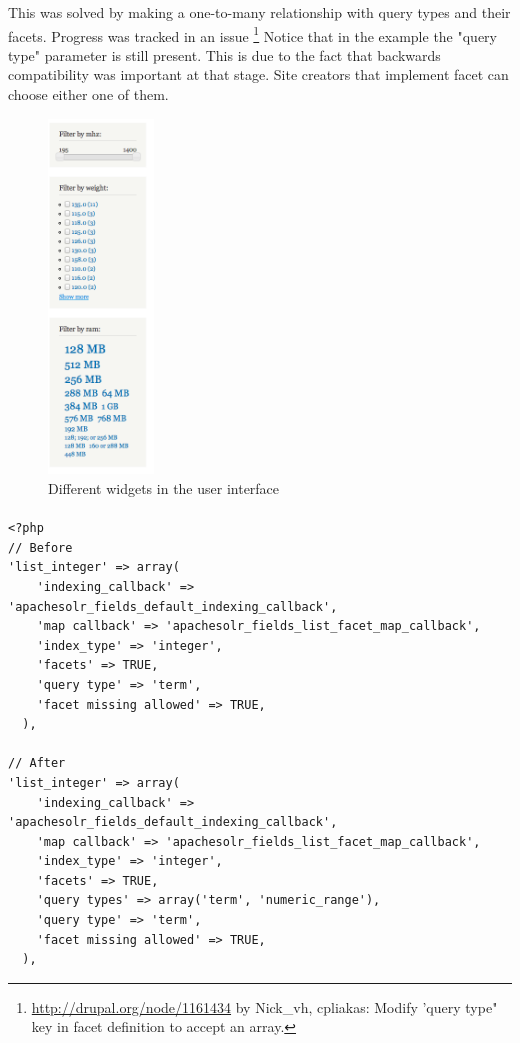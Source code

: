 This was solved by making a one-to-many relationship with query types and their facets. Progress was tracked in an issue \footnote{\url{http://drupal.org/node/1161434} by Nick\_vh, cpliakas: Modify 'query type" key in facet definition to accept an array.} Notice that in the example the "query type" parameter is still present. This is due to the fact that backwards compatibility was important at that stage. Site creators that implement facet can choose either one of them.

\begin{figure}
\begin{center}
     \vspace{-25pt}
     \includegraphics[width=0.25\textwidth]{images/implementation/facetapi_widgets.png}
     \caption{Different widgets in the user interface}
     \vspace{-25pt}
\end{center}
\end{figure}
\paragraph{}
\begin{verbatim}
<?php
// Before
'list_integer' => array(
    'indexing_callback' => 'apachesolr_fields_default_indexing_callback',
    'map callback' => 'apachesolr_fields_list_facet_map_callback',
    'index_type' => 'integer',
    'facets' => TRUE,
    'query type' => 'term',
    'facet missing allowed' => TRUE,
  ),

// After
'list_integer' => array(
    'indexing_callback' => 'apachesolr_fields_default_indexing_callback',
    'map callback' => 'apachesolr_fields_list_facet_map_callback',
    'index_type' => 'integer',
    'facets' => TRUE,
    'query types' => array('term', 'numeric_range'),
    'query type' => 'term',
    'facet missing allowed' => TRUE,
  ),
\end{verbatim}
\caption{A before and after view of the query types key}
\clearpage

